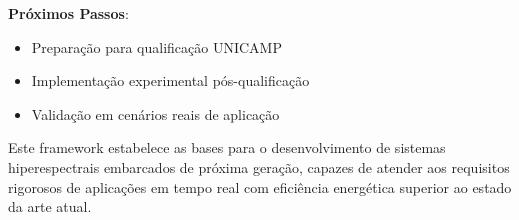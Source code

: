 \textbf{Próximos Passos}:
\begin{itemize}
    \item Preparação para qualificação UNICAMP
    \item Implementação experimental pós-qualificação
    \item Validação em cenários reais de aplicação
\end{itemize}

Este framework estabelece as bases para o desenvolvimento de sistemas hiperespectrais embarcados de próxima geração, capazes de atender aos requisitos rigorosos de aplicações em tempo real com eficiência energética superior ao estado da arte atual.
